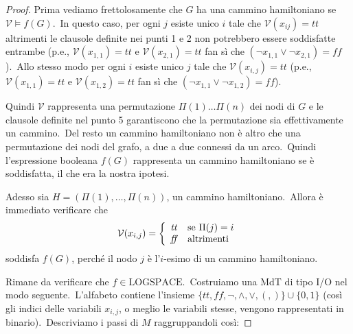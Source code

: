 \begin{proof}
    Prima vediamo frettolosamente che $G$ ha una cammino hamiltoniano se $\mathcal{V} \vDash f(G)$.\
    In questo caso, per ogni $j$ esiste unico $i$ tale che $\mathcal{V}(x_{ij}) = tt$ altrimenti le clausole definite nei punti 1 e 2 non potrebbero essere soddisfatte entrambe (p.e., $\mathcal{V}(x_{1,1}) = tt$ e $\mathcal{V}(x_{2,1}) = tt$ fan sì che $(\neg x_{1,1} \lor \neg x_{2,1}) = \mathit{ff}$).\
    Allo stesso modo per ogni $i$ esiste unico $j$ tale che $\mathcal{V}(x_{i,j}) = tt$ (p.e., $\mathcal{V}(x_{1,1}) = tt$ e $\mathcal{V}(x_{1,2}) = tt$ fan sì che $(\neg x_{1,1} \lor \neg x_{1,2}) = \mathit{ff}$).\

    Quindi $\mathcal{V}$ rappresenta una permutazione $\Pi(1) \dots \Pi(n)$ dei nodi di $G$ e le clausole definite nel punto 5 garantiscono che la permutazione sia effettivamente un cammino.\
    Del resto un cammino hamiltoniano non è altro che una permutazione dei nodi del grafo, a due a due connessi da un arco.\
    Quindi l'espressione booleana $f(G)$ rappresenta un cammino hamiltoniano se è soddisfatta, il che era la nostra ipotesi.

    Adesso sia $H = (\Pi(1), \dots, \Pi(n))$, un cammino hamiltoniano.\
    Allora è immediato verificare che
    \[\mathcal{V}(x_{i,j})=\left\{
        \begin{array}{l l}
            \mathit{tt} & \mathrm{se}\ \Pi(j) = i \\
            \mathit{ff} & \text{altrimenti}       \\
        \end{array}\right.\]
    soddisfa $f(G)$, perché il nodo $j$ è l'$i$-esimo di un cammino hamiltoniano.

    \medskip
    \noindent Rimane da verificare che $f \in \mathrm{LOGSPACE}$.\
    Costruiamo una MdT di tipo I/O nel modo seguente.\
    L'alfabeto contiene l'insieme $\{\mathit{tt}, \mathit{ff}, \neg, \land, \lor, (, )\} \cup \{0,1\}$ (così gli indici delle variabili $x_{i,j}$, o meglio le variabili stesse, vengono rappresentati in binario).\
    Descriviamo i passi di $M$ raggruppandoli così:


\end{proof}
